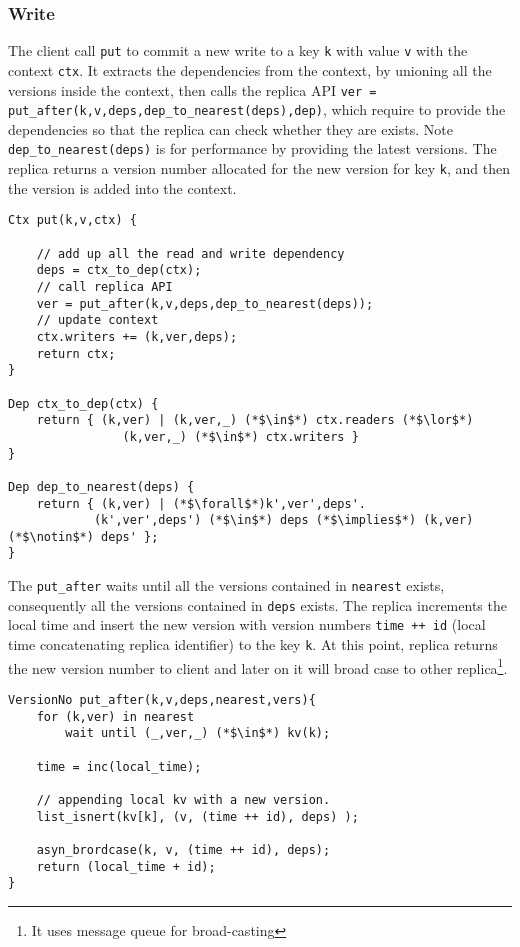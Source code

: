 \subsubsection{Write}

The client call \verb|put| to commit a new write to a key \verb|k| with value \verb|v| with the context \verb|ctx|.
It extracts the dependencies from the context, by unioning all the versions inside the context,
then calls the replica API \verb|ver = put_after(k,v,deps,dep_to_nearest(deps),dep)|,
which require to provide the dependencies so that the replica can check whether they are exists.
Note \verb|dep_to_nearest(deps)| is for performance by providing the latest versions.
The replica returns a version number allocated for the new version for key \verb|k|,
and then the version is added into the context.

\begin{lstlisting}[caption={Client API for write},label={lst:cops-client-api-write}]
Ctx put(k,v,ctx) {

    // add up all the read and write dependency
    deps = ctx_to_dep(ctx);
    // call replica API
    ver = put_after(k,v,deps,dep_to_nearest(deps));
    // update context
    ctx.writers += (k,ver,deps);
    return ctx;
}

Dep ctx_to_dep(ctx) {
    return { (k,ver) | (k,ver,_) (*$\in$*) ctx.readers (*$\lor$*)
                (k,ver,_) (*$\in$*) ctx.writers }
}

Dep dep_to_nearest(deps) {
    return { (k,ver) | (*$\forall$*)k',ver',deps'.
            (k',ver',deps') (*$\in$*) deps (*$\implies$*) (k,ver) (*$\notin$*) deps' };
}
\end{lstlisting}

The \verb|put_after| waits until all the versions contained in \verb|nearest| exists,
consequently all the versions contained in \verb|deps| exists.
The replica increments the local time and insert the new version with version numbers \verb|time ++ id| (local time concatenating replica identifier) to the key \verb|k|.
At this point, replica returns the new version number to client and 
later on it will broad case to other replica\footnote{It uses message queue for broad-casting}.

\begin{lstlisting}[caption={Replica API for write},label={lst:cops-replica-api-write}]
VersionNo put_after(k,v,deps,nearest,vers){
    for (k,ver) in nearest
        wait until (_,ver,_) (*$\in$*) kv(k);

    time = inc(local_time);

    // appending local kv with a new version.
    list_isnert(kv[k], (v, (time ++ id), deps) );

    asyn_brordcase(k, v, (time ++ id), deps);
    return (local_time + id);
}
\end{lstlisting}

